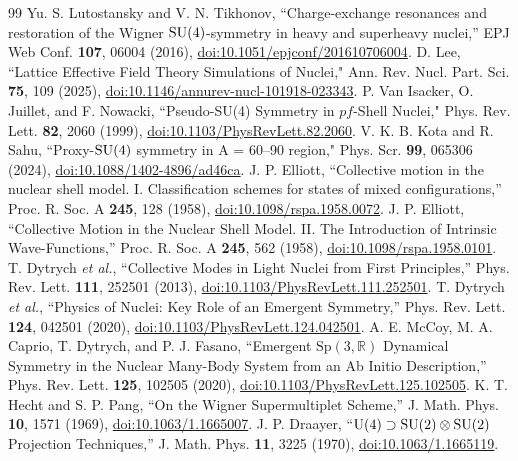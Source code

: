 \documentclass[aps,onecolumn,10pt,superscriptaddress,floatfix,nofootinbib]{revtex4}
\begin{document}
\begin{thebibliography}{99}
 Yu. S. Lutostansky and V. N. Tikhonov, ``Charge-exchange resonances and restoration of the Wigner $\rm SU(4)$-symmetry in heavy and superheavy nuclei,'' EPJ Web Conf. \textbf{107}, 06004 (2016), \href{https://doi.org/10.1051/epjconf/201610706004}{doi:10.1051/epjconf/201610706004}.
 D. Lee, ``Lattice Effective Field Theory Simulations of Nuclei,"  Ann. Rev. Nucl. Part. Sci. \textbf{75}, 109 (2025), \href{https://doi.org/10.1146/annurev-nucl-101918-023343}{doi:10.1146/annurev-nucl-101918-023343}.
 P. Van Isacker, O. Juillet, and F. Nowacki, ``Pseudo-SU(4) Symmetry in $\mathit{pf}$-Shell Nuclei," Phys. Rev. Lett. \textbf{82}, 2060 (1999), \href{https://doi.org/10.1103/PhysRevLett.82.2060}{doi:10.1103/PhysRevLett.82.2060}.
 V. K. B. Kota and R. Sahu, ``Proxy-$\rm SU(4)$ symmetry in A = 60–90 region," Phys. Scr. \textbf{99}, 065306 (2024), \href{https://doi.org/10.1088/1402-4896/ad46ca}{doi:10.1088/1402-4896/ad46ca}.
 J. P. Elliott, ``Collective motion in the nuclear shell model. I. Classification schemes for states of mixed configurations,'' Proc. R. Soc. A \textbf{245}, 128 (1958), \href{https://doi.org/10.1098/rspa.1958.0072}{doi:10.1098/rspa.1958.0072}.
 J. P. Elliott, ``Collective Motion in the Nuclear Shell Model. II. The Introduction of Intrinsic Wave-Functions,'' Proc. R. Soc. A \textbf{245}, 562 (1958), \href{https://doi.org/10.1098/rspa.1958.0101}{doi:10.1098/rspa.1958.0101}.
 T. Dytrych \textit{et al.}, ``Collective Modes in Light Nuclei from First Principles,'' Phys. Rev. Lett. \textbf{111}, 252501 (2013), \href{https://doi.org/10.1103/PhysRevLett.111.252501}{doi:10.1103/PhysRevLett.111.252501}.
 T. Dytrych \textit{et al.}, ``Physics of Nuclei: Key Role of an Emergent Symmetry,'' Phys. Rev. Lett. \textbf{124}, 042501 (2020), \href{https://doi.org/10.1103/PhysRevLett.124.042501}{doi:10.1103/PhysRevLett.124.042501}.
 A. E. McCoy, M. A. Caprio, T. Dytrych, and P. J. Fasano, ``Emergent $\mathrm{Sp}(3,\mathbb{R})$ Dynamical Symmetry in the Nuclear Many-Body System from an Ab Initio Description,'' Phys. Rev. Lett. \textbf{125}, 102505 (2020), \href{https://doi.org/10.1103/PhysRevLett.125.102505}{doi:10.1103/PhysRevLett.125.102505}.
 K. T. Hecht and S. P. Pang, ``On the Wigner Supermultiplet Scheme,'' J. Math. Phys. \textbf{10}, 1571 (1969), \href{https://doi.org/10.1063/1.1665007}{doi:10.1063/1.1665007}.
 J. P. Draayer, ``$\rm U(4)\supset SU(2) \otimes SU(2)$ Projection Techniques,'' J. Math. Phys. \textbf{11}, 3225 (1970), \href{https://doi.org/10.1063/1.1665119}{doi:10.1063/1.1665119}.

\end{thebibliography}
\end{document}
